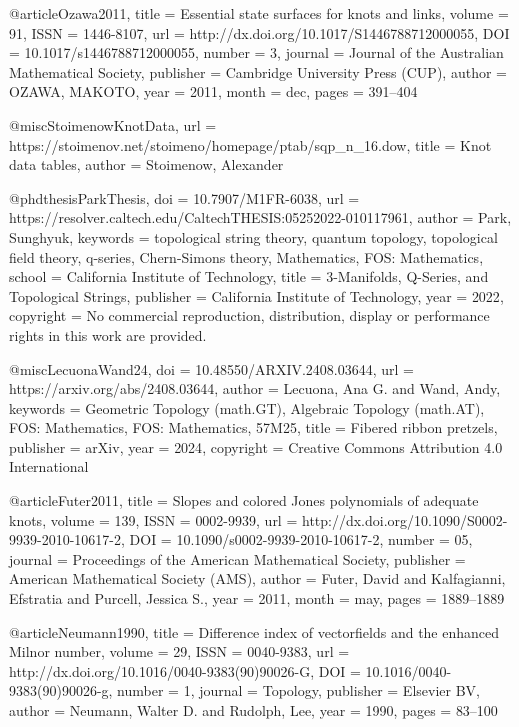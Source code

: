 @article{Ozawa2011,
  title = {Essential state surfaces for knots and links},
  volume = {91},
  ISSN = {1446-8107},
  url = {http://dx.doi.org/10.1017/S1446788712000055},
  DOI = {10.1017/s1446788712000055},
  number = {3},
  journal = {Journal of the Australian Mathematical Society},
  publisher = {Cambridge University Press (CUP)},
  author = {OZAWA,  MAKOTO},
  year = {2011},
  month = dec,
  pages = {391--404}
}

@misc{StoimenowKnotData,
  url = {https://stoimenov.net/stoimeno/homepage/ptab/sqp_n_16.dow},
  title = {Knot data tables},
  author = {Stoimenow, Alexander}
  }


@phdthesis{ParkThesis,
  doi = {10.7907/M1FR-6038},
  url = {https://resolver.caltech.edu/CaltechTHESIS:05252022-010117961},
  author = {Park,  Sunghyuk},
  keywords = {topological string theory,  quantum topology,  topological field theory,  q-series,  Chern-Simons theory,  Mathematics,  FOS: Mathematics},
  school = {California Institute of Technology},
  title = {3-Manifolds,  Q-Series,  and Topological Strings},
  publisher = {California Institute of Technology},
  year = {2022},
  copyright = {No commercial reproduction,  distribution,  display or performance rights in this work are provided.}
}

@misc{LecuonaWand24,
  doi = {10.48550/ARXIV.2408.03644},
  url = {https://arxiv.org/abs/2408.03644},
  author = {Lecuona,  Ana G. and Wand,  Andy},
  keywords = {Geometric Topology (math.GT),  Algebraic Topology (math.AT),  FOS: Mathematics,  FOS: Mathematics,  57M25},
  title = {Fibered ribbon pretzels},
  publisher = {arXiv},
  year = {2024},
  copyright = {Creative Commons Attribution 4.0 International}
}

@article{Futer2011,
  title = {Slopes and colored {Jones} polynomials of adequate knots},
  volume = {139},
  ISSN = {0002-9939},
  url = {http://dx.doi.org/10.1090/S0002-9939-2010-10617-2},
  DOI = {10.1090/s0002-9939-2010-10617-2},
  number = {05},
  journal = {Proceedings of the American Mathematical Society},
  publisher = {American Mathematical Society (AMS)},
  author = {Futer,  David and Kalfagianni,  Efstratia and Purcell,  Jessica S.},
  year = {2011},
  month = may,
  pages = {1889--1889}
}

@article{Neumann1990,
  title = {Difference index of vectorfields and the enhanced {Milnor} number},
  volume = {29},
  ISSN = {0040-9383},
  url = {http://dx.doi.org/10.1016/0040-9383(90)90026-G},
  DOI = {10.1016/0040-9383(90)90026-g},
  number = {1},
  journal = {Topology},
  publisher = {Elsevier BV},
  author = {Neumann,  Walter D. and Rudolph,  Lee},
  year = {1990},
  pages = {83--100}
}

